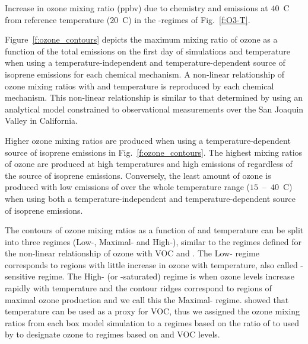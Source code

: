 \begin{table}%
    \centering%
    \caption{Increase in ozone mixing ratio (ppbv) due to chemistry and emissions at $40$~\degree C from reference temperature ($20$~\degree C) in the -regimes of Fig.~\ref{f:O3-T}.}%
    \label{t:differences}%
\end{table}

Figure~\ref{f:ozone_contours} depicts the maximum mixing ratio of ozone as a function of the total  emissions on the first day of simulations and temperature when using a temperature-independent and temperature-dependent source of isoprene emissions for each chemical mechanism.
A non-linear relationship of ozone mixing ratios with  and temperature is reproduced by each chemical mechanism.
This non-linear relationship is similar to that determined by \citet{Pusede:2014} using an analytical model constrained to observational measurements over the San Joaquin Valley in California.

Higher ozone mixing ratios are produced when using a temperature-dependent source of isoprene emissions in Fig.~\ref{f:ozone_contours}.
The highest mixing ratios of ozone are produced at high temperatures and high emissions of  regardless of the source of isoprene emissions.
Conversely, the least amount of ozone is produced with low emissions of  over the whole temperature range ($15$~--~$40$~\degree C) when using both a temperature-independent and temperature-dependent source of isoprene emissions.

The contours of ozone mixing ratios as a function of  and temperature can be split into three  regimes (Low-, Maximal- and High-), similar to the  regimes defined for the non-linear relationship of ozone with VOC and .
The Low- regime corresponds to regions with little increase in ozone with temperature, also called -sensitive regime.
The High- (or -saturated) regime is when ozone levels increase rapidly with temperature and the contour ridges correspond to regions of maximal ozone production and we call this the Maximal- regime.
\citet{Pusede:2014} showed that temperature can be used as a proxy for VOC, thus we assigned the ozone mixing ratios from each box model simulation to a  regimes based on the ratio of  to  used by \citet{Sillman:1995} to designate ozone to  regimes based on  and VOC levels.

